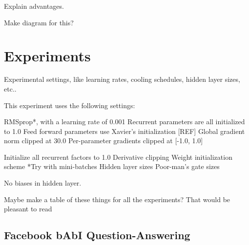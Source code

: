 \documentclass{article}
\begin{document}

Explain advantages.

Make diagram for this?


\section{Experiments}
\label{others}
Experimental settings, like learning rates, cooling schedules, hidden layer sizes, etc..


This experiment uses the following settings:

RMSprop*, with a learning rate of 0.001
Recurrent parameters are all initialized to 1.0
Feed forward parameters use Xavier’s initialization [REF]
Global gradient norm clipped at 30.0
Per-parameter gradients clipped at [-1.0, 1.0]

Initialize all recurrent factors to 1.0
Derivative clipping
Weight initialization scheme
*Try with mini-batches
Hidden layer sizes
Poor-man’s gate sizes

No biases in hidden layer.

Maybe make a table of these things for all the experiments? That would be pleasant to read

\subsection{Facebook bAbI Question-Answering}
\end{document}
